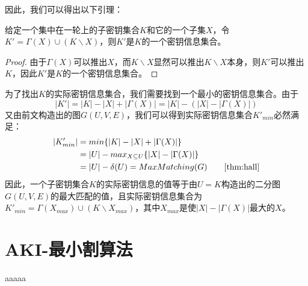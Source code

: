 因此，我们可以得出以下引理：
\begin{lem}
    给定一个集中在一轮上的子密钥集合$K$和它的一个子集$X$，令$K'=\Gamma(X)\cup(K\backslash X)$，则$K'$是$K$的一个密钥信息集合。
\end{lem}
\begin{proof}
    由于$\Gamma(X)$可以推出$X$，而$K\backslash X$显然可以推出$K\backslash X$本身，则$K'$可以推出$K$，因此$K'$是$K$的一个密钥信息集合。
\end{proof}
为了找出$K$的实际密钥信息集合，我们需要找到一个最小的密钥信息集合。由于
$$|K'|=|K|-|X|+|\Gamma(X)|=|K|-(|X|-|\Gamma(X)|)$$
又由前文构造出的图$G(U,V,E)$，我们可以得到实际密钥信息集合$K'_{min}$必然满足：
\[
\begin{split}
    |K'_{min}|&=min\{|K|-|X|+|\Gamma(X)|\}\\
              &=|U|-max_{X\subseteq U}\{|X|-|\Gamma(X)|\}\\
              &=|U|-\delta(U)=MaxMatching(G) \qquad\ref{thm:hall}
\end{split}
\]
因此，一个子密钥集合$K$的实际密钥信息的值等于由$U=K$构造出的二分图$G(U,V,E)$的最大匹配的值，且实际密钥信息集合为$K'_{min}=\Gamma(X_{max})\cup(K\backslash X_{max})$，其中$X_{max}$是使$|X|-|\Gamma(X)|$最大的$X$。

\section{AKI-最小割算法}
aaaaa
